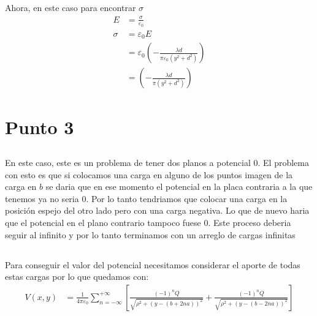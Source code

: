 \documentclass{report}
\begin{document}
\section{}

Ahora, en este caso para encontrar $\sigma$
\begin{align*}
	E &= \frac{\sigma}{\varepsilon_0}\\
	\sigma &= \varepsilon_0 E\\
	&= \varepsilon_0 \left(- \frac{\lambda d}{\pi \varepsilon_0 \left( y^2 + d^2 \right)}\right)\\
	&= \left(- \frac{\lambda d}{\pi\left( y^2 + d^2 \right)}\right)
\end{align*}

\section{}

\chapter{Punto 3}

\section{}

En este caso, este es un problema de tener dos planos a potencial 0. El problema con esto es que si colocamos una carga en alguno de los puntos imagen de la carga en $b$ se daria que en ese momento el potencial en la placa contraria a la que tenemos ya no seria 0. Por lo tanto tendriamos que colocar una carga en la posición espejo del otro lado pero con una carga negativa. Lo que de nuevo haria que el potencial en el plano contrario tampoco fuese 0. Este proceso deberia seguir al infinito y por lo tanto terminamos con un arreglo de cargas infinitas

\section{}

Para conseguir el valor del potencial necesitamos considerar el aporte de todas estas cargas por lo que quedamos con:
\begin{align*}
	V \left( x, y \right) &= \frac{1}{4\pi \varepsilon_0} \sum_{n = -\infty}^{+\infty} \left[ \frac{\left( -1 \right)^n Q}{\sqrt{\rho^2 + (y - \left( b + 2na \right))^2}} +\frac{\left( -1 \right)^n Q}{\sqrt{\rho^2 + (y - \left( b - 2na \right))^2}} \right]
\end{align*}
\end{document}
